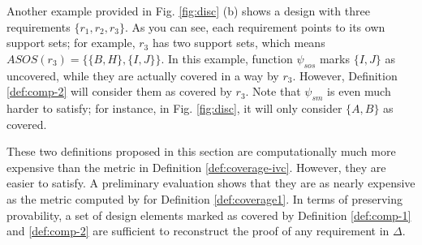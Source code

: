 Another example provided in Fig. \ref{fig:disc} (b) shows a design with 
three requirements $\{ r_1, r_2, r_3\}$. As you can see, each requirement points to its 
own support sets; for example, $r_3$ has two support sets, 
which means $ASOS(r_3) = \{ \{B, H\}, \{I, J\}\}$. In this example, 
function $\psi_{sos}$ marks $\{I, J\}$ as uncovered, while they are actually covered in a way by $r_3$. 
However, Definition \ref{def:comp-2} will consider them as covered by $r_3$. 
Note that $\psi_{sm}$ is even much harder to satisfy; for instance, in Fig. \ref{fig:disc}, 
it will only consider $\{ A, B\}$ as covered.

These two definitions proposed in this section are computationally much more expensive than the metric in Definition \ref{def:coverage-ivc}. However, they are easier to satisfy. A preliminary evaluation shows that they are as nearly expensive as the metric computed by \mustalg for Definition \ref{def:coverage1}. 
In terms of preserving provability, a set of design elements marked as covered by Definition \ref{def:comp-1} and \ref{def:comp-2} are
sufficient to reconstruct the proof of any requirement in $\Delta$. 

